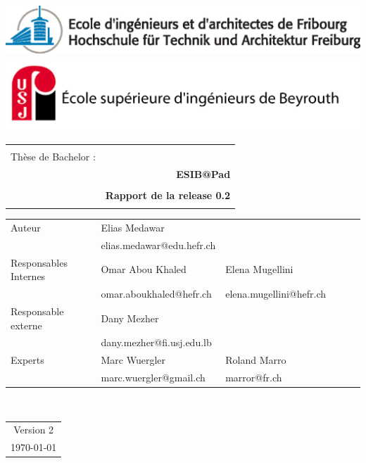 \begin{titlepage}
\setlength\topmargin{0in}
\setlength\headheight{-0.3in}
\begin{center}

\includegraphics[width=1\textwidth]{../comon/logos/EIA_couleur.eps}  \\

\includegraphics[width=1\textwidth]{../comon/logos/esib_nom.jpg}  \\[0.5cm] 
\end{center}

\begin{tabular}{p{9cm} r}
\hline \\[1cm]
{ \huge {Thèse de Bachelor : } } &  \\
&  \huge \bfseries  ESIB@Pad  \\[1cm]
\hline \\[0.3cm]
 & \Large \bfseries Rapport de la  release 0.2\\
 & \Large \bfseries  \\[1cm]
\end{tabular}

\begin{tabular}{l l l l l l}
Auteur & Elias Medawar & \\[0.1cm]
& elias.medawar@edu.hefr.ch & \\[0.5cm]
Responsables Internes  & Omar Abou Khaled & Elena Mugellini  \\[0.1cm]
&omar.aboukhaled@hefr.ch  & elena.mugellini@hefr.ch \\[0.5cm]	
Responsable externe & Dany Mezher & \\[0.1cm]
&dany.mezher@fi.usj.edu.lb   & \\[0.5cm]
Experts & Marc Wuergler  & Roland Marro   \\[.1cm]
&marc.wuergler@gmail.ch & marror@fr.ch \\[1.5cm]	
\end{tabular}
\\
\begin{center}
\begin{tabular}{c}
Version  2 \\[0.5cm]
 {\today} \\[0.5cm]
\end{tabular}
 \end{center}
\end{titlepage}
